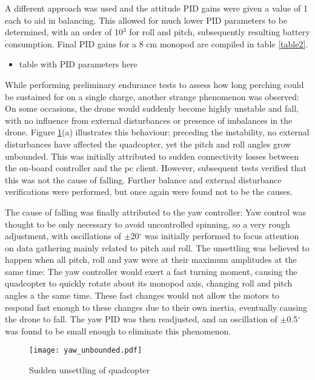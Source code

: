\documentclass[12pt,a4paper]{article}
\begin{document}
A different approach was used and the attitude PID gains were given a value of 1 each to aid in balancing. This allowed for much lower PID parameters to be determined, with an order of 10$^3$ for roll and pitch, subsequently resulting battery consumption. Final PID gains for a 8 cm monopod are compiled in table \ref{table2}. 

\begin{itemize}
\item table with PID parameters here
\end{itemize}

While performing preliminary endurance tests to assess how long perching could be sustained for on a single charge, another strange phenomenon was observed: On some occasions, the drone would suddenly become highly unstable and fall, with no influence from external disturbances or presence of imbalances in the drone. Figure \ref{fig10}(a) illustrates this behaviour: preceding the instability, no external disturbances have affected the quadcopter, yet the pitch and roll angles grow unbounded. This was initially attributed to sudden connectivity losses between the on-board controller and the pc client. However, subsequent tests verified that this was not the cause of falling. Further balance and external disturbance verifications were performed, but once again were found not to be the causes.

The cause of falling was finally attributed to the yaw controller: Yaw control was thought to be only necessary to avoid uncontrolled spinning, so a very rough adjustment, with oscillations of $\pm$20$^{\circ}$ was initially performed to focus attention on data gathering mainly related to pitch and roll. The unsettling was believed to happen when all pitch, roll and yaw were at their maximum amplitudes at the same time: The yaw controller would exert a fast turning moment, causing the quadcopter to quickly rotate about its monopod axis, changing roll and pitch angles a the same time. These fast changes would not allow the motors to respond fast enough to these changes due to their own inertia, eventually causing the drone to fall. The yaw PID was then readjusted, and an oscillation of $\pm$0.5$^{\circ}$ was found to be small enough to eliminate this phenomenon.


\begin{figure}[h!]
\centering
 \texttt{[image: yaw\_unbounded.pdf]}
  \caption{Sudden unsettling of quadcopter}
  \label{fig10}
\end{figure}
\end{document}
